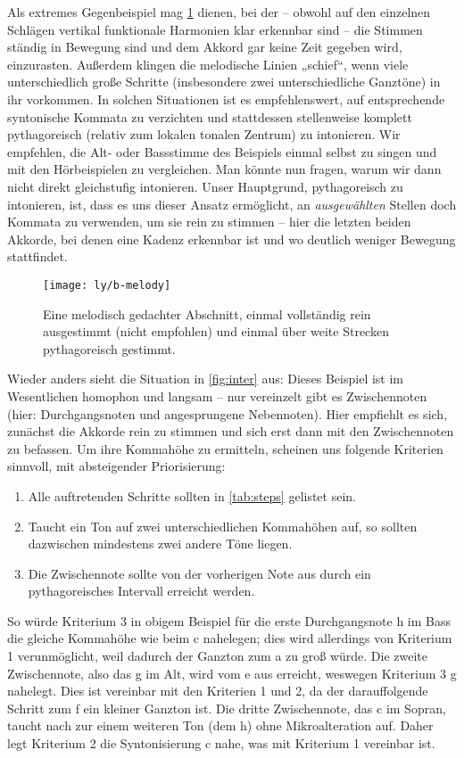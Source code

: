 Als extremes Gegenbeispiel mag \cref{fig:melody} dienen, bei der – obwohl auf
den einzelnen Schlägen vertikal funktionale Harmonien klar erkennbar sind – die
Stimmen ständig in Bewegung sind und dem Akkord gar keine Zeit gegeben wird,
einzurasten. Außerdem klingen die melodische Linien „schief“, wenn viele
unterschiedlich große Schritte (insbesondere zwei unterschiedliche Ganztöne) in
ihr vorkommen.  In solchen Situationen ist es empfehlenswert, auf entsprechende
syntonische Kommata zu verzichten und stattdessen stellenweise komplett
pythagoreisch (relativ zum lokalen tonalen Zentrum) zu intonieren.  Wir
empfehlen, die Alt- oder Bassstimme des Beispiels einmal selbst zu singen und
mit den Hörbeispielen zu vergleichen.  Man könnte nun fragen, warum wir dann
nicht direkt gleichstufig intonieren.  Unser Hauptgrund, pythagoreisch zu
intonieren, ist, dass es uns dieser Ansatz ermöglicht, an \emph{ausgewählten}
Stellen doch Kommata zu verwenden, um sie rein zu stimmen – hier die letzten
beiden Akkorde, bei denen eine Kadenz erkennbar ist und wo deutlich weniger
Bewegung stattfindet.

\begin{figure}
  \centering
  \texttt{[image: ly/b-melody]}
  \caption{Eine melodisch gedachter Abschnitt, einmal
    vollständig rein ausgestimmt (nicht empfohlen) und einmal über weite
    Strecken pythagoreisch gestimmt.}\label{fig:melody}
\end{figure}

Wieder anders sieht die Situation in \cref{fig:inter} aus: Dieses Beispiel ist
im Wesentlichen homophon und langsam – nur vereinzelt gibt es Zwischennoten
(hier: Durchgangsnoten und angesprungene Nebennoten). Hier empfiehlt es sich,
zunächst die Akkorde rein zu stimmen und sich erst dann mit den Zwischennoten zu
befassen. Um ihre Kommahöhe zu ermitteln, scheinen uns folgende Kriterien
sinnvoll, mit absteigender Priorisierung:
\begin{enumerate}
\item Alle auftretenden Schritte sollten in \cref{tab:steps} gelistet sein.
\item Taucht ein Ton auf zwei unterschiedlichen Kommahöhen auf, so sollten
  dazwischen mindestens zwei andere Töne liegen.
\item Die Zwischennote sollte von der vorherigen Note aus durch ein
  pythagoreisches Intervall erreicht werden.
\end{enumerate}
So würde Kriterium 3 in obigem Beispiel für die erste Durchgangsnote h im Bass
die gleiche Kommahöhe wie beim c nahelegen; dies wird allerdings von Kriterium 1
verunmöglicht, weil dadurch der Ganzton zum \naturalm a zu groß würde. Die
zweite Zwischennote, also das g im Alt, wird vom \naturalm e aus erreicht,
weswegen Kriterium 3 \naturalm g nahelegt. Dies ist vereinbar mit den Kriterien
1 und 2, da der darauffolgende Schritt zum f ein kleiner Ganzton ist. Die dritte
Zwischennote, das c im Sopran, taucht nach zur einem weiteren Ton (dem \naturalm
h) ohne Mikroalteration auf. Daher legt Kriterium 2 die Syntonisierung \natural
c nahe, was mit Kriterium 1 vereinbar ist.

